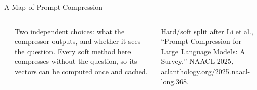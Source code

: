 \begin{frame}{A Map of Prompt Compression}
\begin{columns}[T,onlytextwidth]
\\[0.4em]
      {\scriptsize Two independent choices: what the compressor outputs, and whether it sees the question. Every soft method here compresses without the question, so its vectors can be computed once and cached.\par}
      \vspace{0.3em}
      {\scriptsize Hard/soft split after Li et al., ``Prompt Compression for Large Language Models: A Survey,'' NAACL 2025, \href{https://aclanthology.org/2025.naacl-long.368/}{aclanthology.org/2025.naacl-long.368}.\par}
  \end{columns}
\end{frame}

